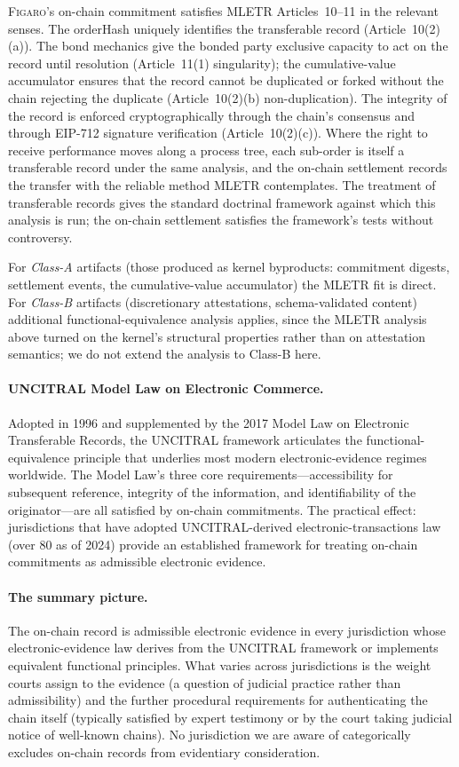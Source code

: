 \documentclass[11pt,a4paper]{article}
\theoremstyle{remark}
\newcommand{\figaro}{\textsc{Figaro}}
\begin{document}
\figaro{}'s on-chain commitment satisfies MLETR Articles~10--11 in
the relevant senses. The orderHash uniquely identifies the
transferable record (Article~10(2)(a)). The bond mechanics give
the bonded party exclusive capacity to act on the record until
resolution (Article~11(1) singularity); the cumulative-value
accumulator ensures that the record cannot be duplicated or
forked without the chain rejecting the duplicate (Article~10(2)(b)
non-duplication). The integrity of the record is enforced
cryptographically through the chain's consensus and through
EIP-712 signature verification (Article~10(2)(c)). Where the
right to receive performance moves along a process tree, each
sub-order is itself a transferable record under the same
analysis, and the on-chain settlement records the transfer with
the reliable method MLETR contemplates. The
\citet{goode_gullifer_2017} treatment of transferable records
gives the standard doctrinal framework against which this analysis
is run; the on-chain settlement satisfies the framework's tests
without controversy.

For \emph{Class-A} artifacts (those produced as kernel byproducts:
commitment digests, settlement events, the cumulative-value
accumulator) the MLETR fit is direct. For \emph{Class-B} artifacts
(discretionary attestations, schema-validated content)
additional functional-equivalence analysis applies, since the
MLETR analysis above turned on the kernel's structural properties
rather than on attestation semantics; we do not extend the
analysis to Class-B here.

\paragraph{UNCITRAL Model Law on Electronic Commerce.}
Adopted in 1996 and supplemented by the 2017 Model Law on
Electronic Transferable Records, the UNCITRAL framework
articulates the functional-equivalence principle that underlies
most modern electronic-evidence regimes worldwide. The Model
Law's three core requirements---accessibility for subsequent
reference, integrity of the information, and identifiability of
the originator---are all satisfied by on-chain commitments. The
practical effect: jurisdictions that have adopted UNCITRAL-derived
electronic-transactions law (over 80 as of 2024) provide an
established framework for treating on-chain commitments as
admissible electronic evidence.

\paragraph{The summary picture.}
The on-chain record is admissible electronic evidence in every
jurisdiction whose electronic-evidence law derives from the
UNCITRAL framework or implements equivalent functional principles.
What varies across jurisdictions is the weight courts assign to
the evidence (a question of judicial practice rather than
admissibility) and the further procedural requirements for
authenticating the chain itself (typically satisfied by expert
testimony or by the court taking judicial notice of well-known
chains). No jurisdiction we are aware of categorically excludes
on-chain records from evidentiary consideration.
\end{document}
